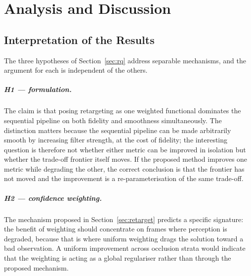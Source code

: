 \chapter{Analysis and Discussion}
\label{ch:disc}

\section{Interpretation of the Results}
\label{sec:interpretation}


The three hypotheses of Section~\ref{sec:rq} address separable mechanisms, and
the argument for each is independent of the others.

\paragraph{H1 --- formulation.} The claim is that posing retargeting as one
weighted functional dominates the sequential pipeline on both fidelity and
smoothness simultaneously. The distinction matters because the sequential
pipeline can be made arbitrarily smooth by increasing filter strength, at the
cost of fidelity; the interesting question is therefore not whether either
metric can be improved in isolation but whether the trade-off frontier itself
moves.  If the proposed method improves one metric while
degrading the other, the correct conclusion is that the frontier has not moved
and the improvement is a re-parameterisation of the same trade-off.

\paragraph{H2 --- confidence weighting.} The mechanism proposed in
Section~\ref{sec:retarget} predicts a specific signature: the benefit of
weighting should concentrate on frames where perception is degraded, because
that is where uniform weighting drags the solution toward a bad observation.
A uniform improvement across occlusion strata would indicate that the weighting
is acting as a global regulariser rather than through the proposed mechanism.

